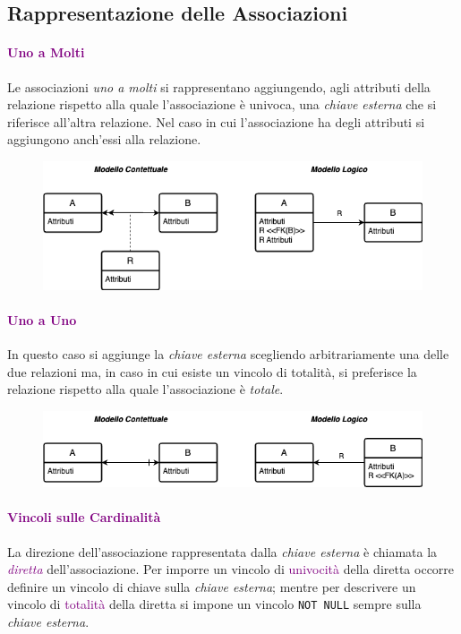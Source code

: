 \subsection{Rappresentazione delle Associazioni}

\paragraph{\textcolor{purple}{Uno a Molti}}
Le associazioni \emph{uno a molti} si rappresentano aggiungendo, agli attributi
della relazione rispetto alla quale l'associazione è univoca, una
\emph{chiave esterna} che si riferisce all'altra relazione. Nel caso in
cui l'associazione ha degli attributi si aggiungono anch'essi alla relazione.

\begin{figure}[H]
    \centering
    \includegraphics[scale=0.55]{img/unomolti.png}
\end{figure}

\paragraph{\textcolor{purple}{Uno a Uno}}
In questo caso si aggiunge la \emph{chiave esterna}
scegliendo arbitrariamente una delle due relazioni ma, in caso in
cui esiste un vincolo di totalità, si preferisce la relazione
rispetto alla quale l'associazione è \emph{totale}.

\begin{figure}[H]
    \centering
    \includegraphics[scale=0.55]{img/unouno.png}
\end{figure}

\paragraph{\textcolor{purple}{Vincoli sulle Cardinalità}} La direzione dell'associazione
rappresentata dalla \emph{chiave esterna} è chiamata la \emph{\textcolor{purple}{diretta}}
dell'associazione. Per imporre un vincolo di \textcolor{purple}{univocità} della diretta occorre definire
un vincolo di chiave sulla \emph{chiave esterna}; mentre per descrivere un vincolo di \textcolor{purple}{totalità}
della diretta si impone un vincolo \verb|NOT NULL| sempre sulla \emph{chiave esterna}.

